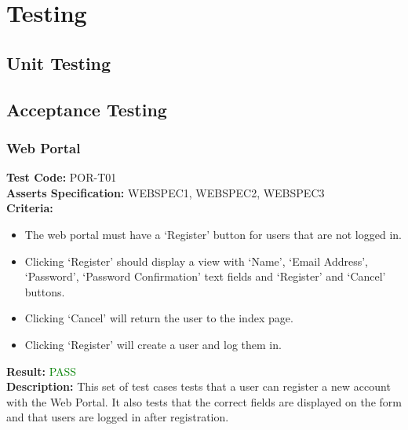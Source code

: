 \documentclass[11pt,a4paper]{report}
\begin{document}
\chapter{Testing}
\label{sec:testing}
\section{Unit Testing}
\label{sec:unit-testint}
\section{Acceptance Testing}
\label{sec:acceptance-testint}

\subsection{Web Portal}

\label{test:POR-T01}
\noindent\textbf{Test Code:} POR-T01\\
\textbf{Asserts Specification:} WEBSPEC1, WEBSPEC2, WEBSPEC3 \\ 
\textbf{Criteria:} \begin{itemize}
                     \item The web portal must have a `Register' button for users that are not logged in.
                     \item Clicking `Register' should display a view with `Name', `Email Address', `Password', `Password Confirmation' text fields and `Register' and `Cancel' buttons.
                     \item Clicking `Cancel' will return the user to the index page.
                     \item Clicking `Register' will create a user and log them in.
                   \end{itemize}  
\textbf{Result:} \textcolor{green}{PASS}\\ 
\textbf{Description:} This set of test cases tests that a user can register a new account with the Web Portal. It also tests that the correct fields are displayed on the form and that users are logged in after registration.\\
\end{document}
